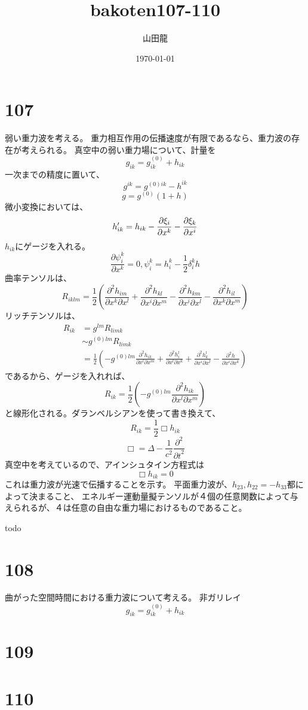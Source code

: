 \documentclass[twocolumn]{jsarticle}
\date{\today}
\author{山田龍}
\title{bakoten107-110}
\newcommand{\pder}[2][]{\frac{\partial#1}{\partial#2}}
\newcommand{\ppder}[2][]{\frac{\partial^2#1}{{\partial#2}^2}}
\newcommand{\pikder}[3][]{\frac{\partial^2#1}{{\partial#2 \partial#3}}}
\newcommand{\pderx}[2][]{\pder[#1]{x^{#2}}}
\newcommand{\half}{\frac{1}{2}}
\newcommand{\beq}{\begin{equation}}
\newcommand{\eeq}{\end{equation}}
\newcommand{\ze}{(0)}
\begin{document}
\maketitle
\section{107}
弱い重力波を考える。
重力相互作用の伝播速度が有限であるなら、重力波の存在が考えられる。
真空中の弱い重力場について、計量を
\beq
g_{ik} = g^{\ze}_{ik} + h_{ik} 
\eeq
一次までの精度に置いて、
\beq
g^{ik} = g^{\ze ik} - h^{ik} 
\eeq
\beq
g = g^{\ze}(1 + h)
\eeq
微小変換においては、
\beq
h^\pr_{ik} = h_{ik} - \pderx[\xi_i]{k}- \pderx[\xi_k]{i}
\eeq
$h_{ik}$にゲージを入れる。
\beq
    \pderx[\psi^k_i]{k} = 0, \psi^k_i = h^k_i - \half \delta^k_i h
\eeq
曲率テンソルは、
\beq
R_{iklm} = \half(\pikder[h_{im}]{x^k}{x^l}+\pikder[h_{kl}]{x^i}{x^m}-
\pikder[h_{km}]{x^i}{x^l}-\pikder[h_{il}]{x^k}{x^m})
\eeq
リッチテンソルは、
\begin{align}
    R_{ik} &= g^{lm}R_{limk}\\
           &\sim g^{\ze lm}R_{limk}\\
           &= \half(-g^{\ze lm}\pikder[h_{ik}]{x^l}{x^m} + \pikder[h^l_{i}]{x^l}{x^k}+ \pikder[h^l_{k}]{x^i}{x^l}-\pikder[h]{x^i}{x^k}) 
\end{align}
であるから、ゲージを入れれば、
\beq
R_{ik} = \half(-g^{\ze lm}\pikder[h_{ik}]{x^l}{x^m})
\eeq
と線形化される。ダランベルシアンを使って書き換えて、
\beq
R_{ik} = \half \Box h_{ik}
\eeq
\beq
\Box = \Delta - \frac{1}{c^2} \ppder[]{t}
\eeq
真空中を考えているので、アインシュタイン方程式は
\beq
\Box h_{ik} = 0
\eeq
これは重力波が光速で伝播することを示す。
平面重力波が、$h_{23},h_{22}=-h_{33}$都によって決まること、
エネルギー運動量擬テンソルが４個の任意関数によって与えられるが、４は任意の自由な重力場におけるものであること。

todo
\section{108}
曲がった空間時間における重力波について考える。
非ガリレイ
\beq
g_{ik} = g^{\ze}_{ik} + h_{ik} 
\eeq

\section{109}
\section{110}
\end{document}
